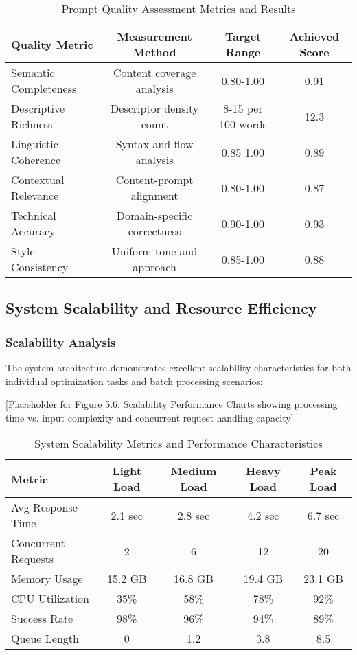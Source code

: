 \begin{table}[H]
\centering
\caption{Prompt Quality Assessment Metrics and Results}
\label{tab:prompt_quality_metrics}
{\begin{tabular}{lccc}
\toprule
\textbf{Quality Metric} & \textbf{Measurement Method} & \textbf{Target Range} & \textbf{Achieved Score} \\
\midrule
Semantic Completeness & Content coverage analysis & 0.80-1.00 & 0.91 \\
Descriptive Richness & Descriptor density count & 8-15 per 100 words & 12.3 \\
Linguistic Coherence & Syntax and flow analysis & 0.85-1.00 & 0.89 \\
Contextual Relevance & Content-prompt alignment & 0.80-1.00 & 0.87 \\
Technical Accuracy & Domain-specific correctness & 0.90-1.00 & 0.93 \\
Style Consistency & Uniform tone and approach & 0.85-1.00 & 0.88 \\
\bottomrule
\end{tabular}}
\end{table}

\subsection{System Scalability and Resource Efficiency}

\subsubsection{Scalability Analysis}

The system architecture demonstrates excellent scalability characteristics for both individual optimization tasks and batch processing scenarios:

[Placeholder for Figure 5.6: Scalability Performance Charts showing processing time vs. input complexity and concurrent request handling capacity]

\begin{table}[H]
\centering
\caption{System Scalability Metrics and Performance Characteristics}
\label{tab:scalability_metrics}
{\begin{tabular}{lcccc}
\toprule
\textbf{Metric} & \textbf{Light Load} & \textbf{Medium Load} & \textbf{Heavy Load} & \textbf{Peak Load} \\
\midrule
Avg Response Time & 2.1 sec & 2.8 sec & 4.2 sec & 6.7 sec \\
Concurrent Requests & 2 & 6 & 12 & 20 \\
Memory Usage & 15.2 GB & 16.8 GB & 19.4 GB & 23.1 GB \\
CPU Utilization & 35\% & 58\% & 78\% & 92\% \\
Success Rate & 98\% & 96\% & 94\% & 89\% \\
Queue Length & 0 & 1.2 & 3.8 & 8.5 \\
\bottomrule
\end{tabular}}
\end{table}

